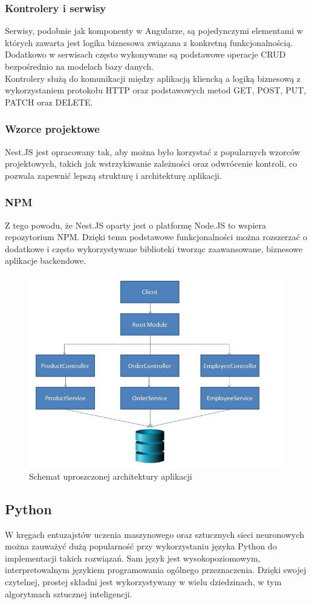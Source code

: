 \subsubsection{Kontrolery i serwisy}
Serwisy, podobnie jak komponenty w Angularze, są pojedynczymi elementami w których zawarta jest logika biznesowa związana z konkretną funkcjonalnością. Dodatkowo w serwisach często wykonywane są podstawowe operacje CRUD bezpośrednio na modelach bazy danych. \\
Kontrolery służą do komunikacji między aplikacją kliencką a logiką biznesową z wykorzystaniem protokołu HTTP oraz podstawowych metod GET, POST, PUT, PATCH oraz DELETE.

\subsubsection{Wzorce projektowe}
Nest.JS jest opracowany tak, aby można było korzystać z popularnych wzorców projektowych, takich jak wstrzykiwanie zależności oraz odwrócenie kontroli, co pozwala zapewnić lepszą strukturę i architekturę aplikacji.

\subsubsection{NPM}
Z tego powodu, że Nest.JS oparty jest o platformę Node.JS to wspiera repozytorium NPM. Dzięki temu podstawowe funkcjonalności można rozszerzać o dodatkowe i często wykorzystywane biblioteki tworząc zaawansowane, biznesowe aplikacje backendowe.

\begin{figure}[ht]
	\centering
		\includegraphics[width=0.6\linewidth]{imgs/nest-diag.jpeg}
	\caption{Schemat uproszczonej architektury aplikacji}
	\label{fig:nest-uproszczona-architektura}
\end{figure}

\subsection{Python}
W kręgach entuzajstów uczenia maszynowego oraz sztucznych sieci neuronowych można zauważyć dużą popularność przy wykorzystaniu języka Python do implementacji takich rozwiązań. Sam język jest wysokopoziomowym, interpretowalnym językiem programowania ogólnego przeznaczenia. Dzięki swojej czytelnej, prostej składni jest wykorzystywany w wielu dziedzinach, w tym algorytmach sztucznej inteligencji.

